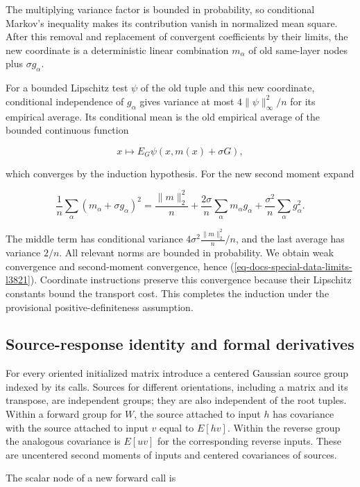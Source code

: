 \documentclass[
  11pt,
]{article}
\theoremstyle{definition}
\theoremstyle{plain}
\theoremstyle{plain}
\theoremstyle{plain}
\theoremstyle{remark}
\begin{document}
The multiplying variance factor is bounded in probability, so
conditional Markov's inequality makes its contribution vanish in
normalized mean square. After this removal and replacement of convergent
coefficients by their limits, the new coordinate is a deterministic
linear combination \(m_\alpha\) of old same-layer nodes plus
\(\sigma g_\alpha\).

For a bounded Lipschitz test \(\psi\) of the old tuple and this new
coordinate, conditional independence of \(g_\alpha\) gives variance at
most \(4\|\psi\|_\infty^2/n\) for its empirical average. Its conditional
mean is the old empirical average of the bounded continuous function

\[
x\longmapsto E_G\psi(x,m(x)+\sigma G),
\]

which converges by the induction hypothesis. For the new second moment
expand

\[
\frac1n\sum_\alpha(m_\alpha+\sigma g_\alpha)^2
=\frac{\|m\|_2^2}{n}+\frac{2\sigma}{n}\sum_\alpha m_\alpha g_\alpha
 +\frac{\sigma^2}{n}\sum_\alpha g_\alpha^2.
\]

The middle term has conditional variance
\(4\sigma^2\frac{\|m\|_2^2}{n}/n\), and the last average has variance
\(2/n\). All relevant norms are bounded in probability. We obtain weak
convergence and second-moment convergence, hence
(\ref{eq-docs-special-data-limits-l3821}). Coordinate instructions
preserve this convergence because their Lipschitz constants bound the
transport cost. This completes the induction under the provisional
positive-definiteness assumption.

\subsection{Source-response identity and formal
derivatives}\label{sec-docs-special-data-limits-l3946}

For every oriented initialized matrix introduce a centered Gaussian
source group indexed by its calls. Sources for different orientations,
including a matrix and its transpose, are independent groups; they are
also independent of the root tuples. Within a forward group for \(W\),
the source attached to input \(h\) has covariance with the source
attached to input \(v\) equal to \(E[hv]\). Within the reverse group the
analogous covariance is \(E[uv]\) for the corresponding reverse inputs.
These are uncentered second moments of inputs and centered covariances
of sources.

The scalar node of a new forward call is
\end{document}

